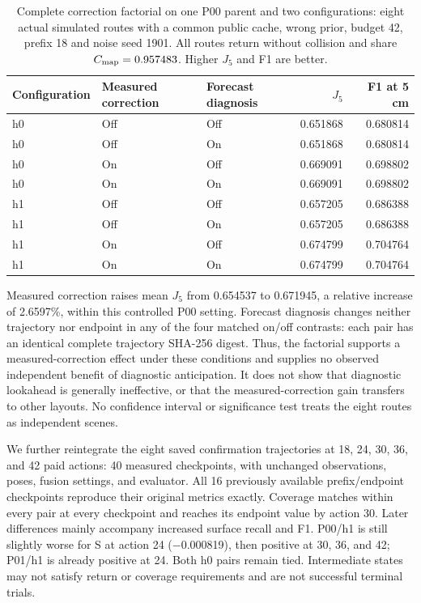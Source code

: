 \begin{table}[!htbp]
\caption{Complete correction factorial on one P00 parent and two configurations: eight actual simulated routes with a common public cache, wrong prior, budget 42, prefix 18 and noise seed 1901. All routes return without collision and share $C_{\rm map}=0.957483$. Higher $J_5$ and F1 are better.}
\label{tab:archived-correction-factorial}
\centering\small\renewcommand{\arraystretch}{1.12}
\begin{tabular}{@{}lllrr@{}}
\toprule
Configuration & Measured correction & Forecast diagnosis & $J_5$ & F1 at 5 cm \\
\midrule
h0 & Off & Off & 0.651868 & 0.680814 \\
h0 & Off & On & 0.651868 & 0.680814 \\
h0 & On & Off & 0.669091 & 0.698802 \\
h0 & On & On & 0.669091 & 0.698802 \\
h1 & Off & Off & 0.657205 & 0.686388 \\
h1 & Off & On & 0.657205 & 0.686388 \\
h1 & On & Off & 0.674799 & 0.704764 \\
h1 & On & On & 0.674799 & 0.704764 \\
\bottomrule
\end{tabular}
\end{table}

Measured correction raises mean $J_5$ from 0.654537 to 0.671945, a relative increase of 2.6597\%, within this controlled P00 setting. Forecast diagnosis changes neither trajectory nor endpoint in any of the four matched on/off contrasts: each pair has an identical complete trajectory SHA-256 digest. Thus, the factorial supports a measured-correction effect under these conditions and supplies no observed independent benefit of diagnostic anticipation. It does not show that diagnostic lookahead is generally ineffective, or that the measured-correction gain transfers to other layouts. No confidence interval or significance test treats the eight routes as independent scenes.


We further reintegrate the eight saved confirmation trajectories at 18, 24, 30, 36, and 42 paid actions: 40 measured checkpoints, with unchanged observations, poses, fusion settings, and evaluator. All 16 previously available prefix/endpoint checkpoints reproduce their original metrics exactly. Coverage matches within every pair at every checkpoint and reaches its endpoint value by action 30. Later differences mainly accompany increased surface recall and F1. P00/h1 is still slightly worse for S at action 24 (\ensuremath{-}0.000819), then positive at 30, 36, and 42; P01/h1 is already positive at 24. Both h0 pairs remain tied. Intermediate states may not satisfy return or coverage requirements and are not successful terminal trials.



